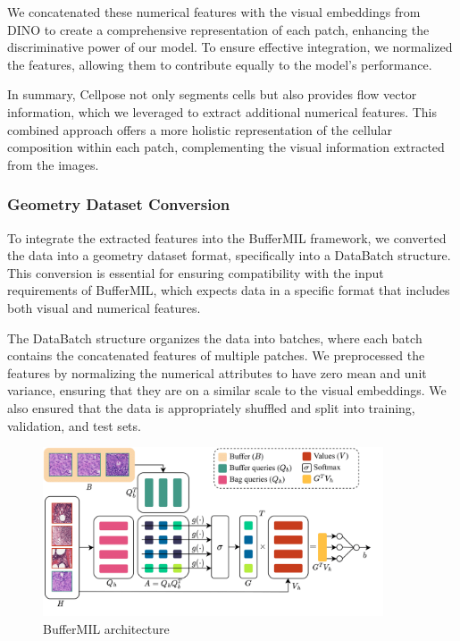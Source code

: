 \documentclass[10pt,twocolumn]{article}
\begin{document}
We concatenated these numerical features with the visual embeddings from DINO to create a comprehensive representation of each patch, enhancing the discriminative power of our model. To ensure effective integration, we normalized the features, allowing them to contribute equally to the model's performance.

In summary, Cellpose not only segments cells but also provides flow vector information, which we leveraged to extract additional numerical features. This combined approach offers a more holistic representation of the cellular composition within each patch, complementing the visual information extracted from the images.

\subsubsection{Geometry Dataset Conversion}

To integrate the extracted features into the BufferMIL framework, we converted the data into a geometry dataset format, specifically into a DataBatch structure. This conversion is essential for ensuring compatibility with the input requirements of BufferMIL, which expects data in a specific format that includes both visual and numerical features.

The DataBatch structure organizes the data into batches, where each batch contains the concatenated features of multiple patches. We preprocessed the features by normalizing the numerical attributes to have zero mean and unit variance, ensuring that they are on a similar scale to the visual embeddings. We also ensured that the data is appropriately shuffled and split into training, validation, and test sets.


\begin{figure}[!htb]
\centering
\includegraphics[width=\linewidth, height=5cm]{images/buffermil.png}
\caption{BufferMIL architecture} 
\label{buffermil_arc}
\end{figure}
\end{document}
